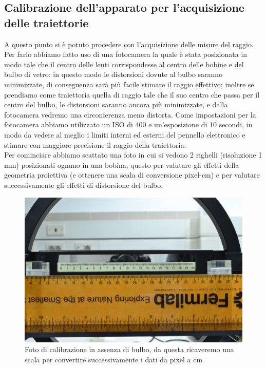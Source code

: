 \documentclass[10pt, a4paper, italian]{article}
\begin{document}
\subsection{Calibrazione dell'apparato per l'acquisizione delle traiettorie}
\label{sec: conv}
A questo punto si è potuto procedere con l'acquisizione delle misure del raggio.
Per farlo abbiamo fatto uso di una fotocamera la quale è stata posizionata in modo tale che il centro delle lenti corrispondesse al centro delle bobine e del bulbo di vetro: in questo modo le distorsioni dovute al bulbo saranno minimizzate, di conseguenza sarà più facile stimare il raggio effettivo; inoltre se prendiamo come traiettoria quella di raggio tale che il suo centro che passa per il centro del bulbo, le distorsioni saranno ancora più minimizzate, e dalla fotocamera vedremo una circonferenza meno distorta.
Come impostazioni per la fotocamera abbiamo utilizzato un ISO di 400 e un'esposizione di 10 secondi, in modo da vedere al meglio i limiti interni ed esterni del pennello elettronico e stimare con maggiore precisione il raggio della traiettoria.\\
Per cominciare abbiamo scattato una foto in cui si vedono 2 righelli (risoluzione 1 mm) posizionati ognuno in una bobina, questo per valutare gli effetti della geometria proiettiva (e ottenere una scala di conversione pixel-cm) e per valutare successivamente gli effetti di distorsione del bulbo.
\begin{figure}
\includegraphics[width=\textwidth]{cal1}
\caption{Foto di calibrazione in assenza di bulbo, da questa ricaveremo una scala per convertire successivamente i dati da pixel a cm}
\end{figure}
\end{document}
